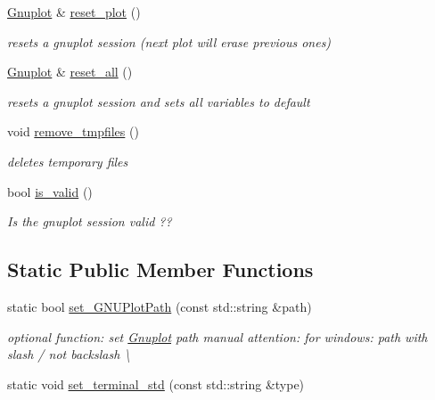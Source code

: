 \begin{DoxyCompactItemize}
\mbox{\label{classGnuplot_a6797761712d3c311e3685bcccba65dd4}} 
\hyperlink{classGnuplot}{Gnuplot} \& \hyperlink{classGnuplot_a6797761712d3c311e3685bcccba65dd4}{reset\+\_\+plot} ()
\begin{DoxyCompactList}\small\item\em resets a gnuplot session (next plot will erase previous ones) \end{DoxyCompactList}\item 
\mbox{\label{classGnuplot_a9aedfe8371083a1a3ac2b9493810049c}} 
\hyperlink{classGnuplot}{Gnuplot} \& \hyperlink{classGnuplot_a9aedfe8371083a1a3ac2b9493810049c}{reset\+\_\+all} ()
\begin{DoxyCompactList}\small\item\em resets a gnuplot session and sets all variables to default \end{DoxyCompactList}\item 
\mbox{\label{classGnuplot_a2e449552587b0055f40f4ee079d62a8d}} 
void \hyperlink{classGnuplot_a2e449552587b0055f40f4ee079d62a8d}{remove\+\_\+tmpfiles} ()
\begin{DoxyCompactList}\small\item\em deletes temporary files \end{DoxyCompactList}\item 
bool \hyperlink{classGnuplot_a3135ffebb308b50c4f3178a62b23ab03}{is\+\_\+valid} ()
\begin{DoxyCompactList}\small\item\em Is the gnuplot session valid ?? \end{DoxyCompactList}\end{DoxyCompactItemize}
\subsection*{Static Public Member Functions}
\begin{DoxyCompactItemize}
\item 
static bool \hyperlink{classGnuplot_a67cae885c26ced821e335d98986f1967}{set\+\_\+\+G\+N\+U\+Plot\+Path} (const std\+::string \&path)
\begin{DoxyCompactList}\small\item\em optional function\+: set \hyperlink{classGnuplot}{Gnuplot} path manual attention\+: for windows\+: path with slash \textquotesingle{}/\textquotesingle{} not backslash \textquotesingle{}\textbackslash{}\textquotesingle{} \end{DoxyCompactList}\item 
static void \hyperlink{classGnuplot_a21feba7a3916708b742c3dc25850ab2f}{set\+\_\+terminal\+\_\+std} (const std\+::string \&type)
\end{DoxyCompactItemize}


